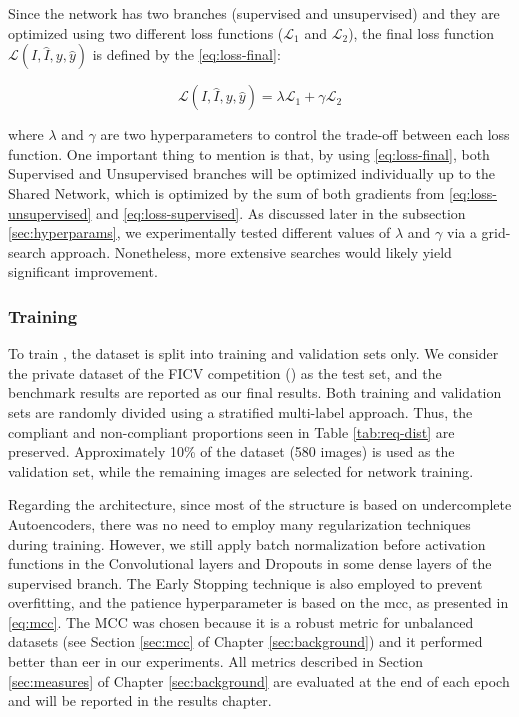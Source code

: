 Since the network has two branches (supervised and unsupervised) and they are optimized using two different loss functions ($\mathcal{L}_1$ and $\mathcal{L}_2$), the final loss function $\mathcal{L}(I, \hat{I}, y, \hat{y})$ is defined by the \autoref{eq:loss-final}:

\begin{equation}
\label{eq:loss-final}
\mathcal{L}(I, \hat{I}, y, \hat{y}) = \lambda\mathcal{L}_1 + \gamma\mathcal{L}_2
\end{equation}

\noindent where $\lambda$ and $\gamma$ are two hyperparameters to control the trade-off between each loss function. One important thing to mention is that, by using \autoref{eq:loss-final}, both Supervised and Unsupervised branches will be optimized individually up to the Shared Network, which is optimized by the sum of both gradients from \autoref{eq:loss-unsupervised} and \autoref{eq:loss-supervised}. As discussed later in the subsection \ref{sec:hyperparams}, we experimentally tested different values of $\lambda$ and $\gamma$ via a grid-search approach. Nonetheless, more extensive searches would likely yield significant improvement.

\subsubsection{Training} 

To train \methodname, the \adhoc dataset is split into training and validation sets only. We consider the private dataset of the FICV competition (\ficvofficial) as the test set, and the benchmark results are reported as our final results. Both training and validation sets are randomly divided using a stratified multi-label approach. Thus, the compliant and non-compliant proportions seen in Table \ref{tab:req-dist} are preserved. Approximately 10\% of the dataset (580 images) is used as the validation set, while the remaining images are selected for network training.

Regarding the architecture, since most of the \methodname structure is based on undercomplete Autoencoders, there was no need to employ many regularization techniques during training. However, we still apply batch normalization before activation functions in the Convolutional layers and Dropouts in some dense layers of the supervised branch. The Early Stopping technique is also employed to prevent overfitting, and the patience hyperparameter is based on the \acf{mcc}, as presented in \autoref{eq:mcc}. The MCC was chosen because it is a robust metric for unbalanced datasets (see Section \ref{sec:mcc} of Chapter \ref{sec:background}) and it performed better than \acs{eer} in our experiments. All metrics described in Section \ref{sec:measures} of Chapter \ref{sec:background} are evaluated at the end of each epoch and will be reported in the results chapter.

